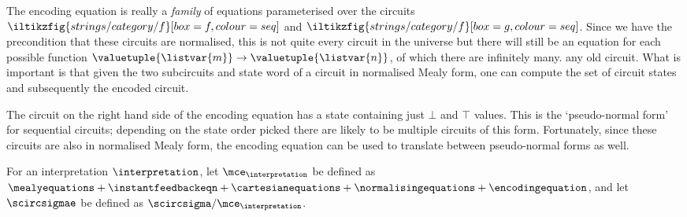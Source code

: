 

\begin{remark}
    The encoding equation is really a \emph{family} of equations parameterised
    over the circuits \(
        \iltikzfig{strings/category/f}[box=f,colour=seq]
    \) and \(
        \iltikzfig{strings/category/f}[box=g,colour=seq]
    \).
    Since we have the precondition that these circuits are normalised, this is
    not quite every circuit in the universe but there will still be an equation
    for each possible function \(
        \valuetuple{\listvar{m}} \to \valuetuple{\listvar{n}}
    \), of which there are infinitely many.
    any old circuit.
    What is important is that given the two subcircuits and state word of a
    circuit in normalised Mealy form, one can compute the set of circuit states
    and subsequently the encoded circuit.
\end{remark}

The circuit on the right hand side of the encoding equation has a state
containing just \(\bot\) and \(\top\) values.
This is the `pseudo-normal form' for sequential circuits; depending on the
state order picked there are likely to be multiple circuits of this form.
Fortunately, since these circuits are also in normalised Mealy form, the
encoding equation can be used to translate between pseudo-normal forms as well.

\begin{definition}
    For an interpretation \(\interpretation\), let
    \(\mce_{\interpretation}\) be defined as \(
        \mealyequations +
        \instantfeedbackeqn +
        \cartesianequations +
        \normalisingequations +
        \encodingequation
    \), and let \(\scircsigmae\) be defined as
    \(\scircsigma / \mce_{\interpretation}\).
\end{definition}

